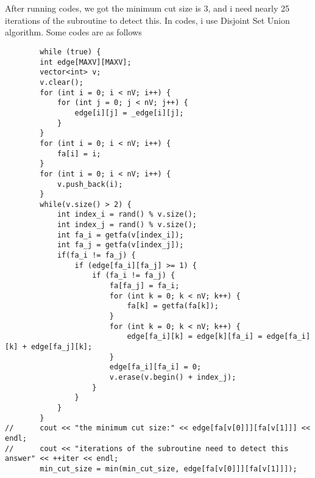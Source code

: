 \documentclass{article}
\begin{document}
	\section{}
		After running codes, we got the minimum cut size is 3, and i need nearly 25 iterations of the subroutine to detect this. In codes, i use Disjoint Set Union algorithm. Some codes are as follows
	\begin{lstlisting}
		while (true) {
		int edge[MAXV][MAXV];
		vector<int> v;
		v.clear();
		for (int i = 0; i < nV; i++) {
			for (int j = 0; j < nV; j++) {
				edge[i][j] = _edge[i][j];
			}
		}
		for (int i = 0; i < nV; i++) {
			fa[i] = i;
		}
		for (int i = 0; i < nV; i++) {
			v.push_back(i);
		}
		while(v.size() > 2) {
			int index_i = rand() % v.size();
			int index_j = rand() % v.size();
			int fa_i = getfa(v[index_i]);
			int fa_j = getfa(v[index_j]);
			if(fa_i != fa_j) {
				if (edge[fa_i][fa_j] >= 1) {
					if (fa_i != fa_j) {
						fa[fa_j] = fa_i;
						for (int k = 0; k < nV; k++) {
							fa[k] = getfa(fa[k]);
						}
						for (int k = 0; k < nV; k++) {
							edge[fa_i][k] = edge[k][fa_i] = edge[fa_i][k] + edge[fa_j][k];
						}
						edge[fa_i][fa_i] = 0;
						v.erase(v.begin() + index_j);
					}
				}
			}
		}	
//		cout << "the minimum cut size:" << edge[fa[v[0]]][fa[v[1]]] << endl;
//		cout << "iterations of the subroutine need to detect this answer" << ++iter << endl;
		min_cut_size = min(min_cut_size, edge[fa[v[0]]][fa[v[1]]]);
	\end{lstlisting}
\end{document}
